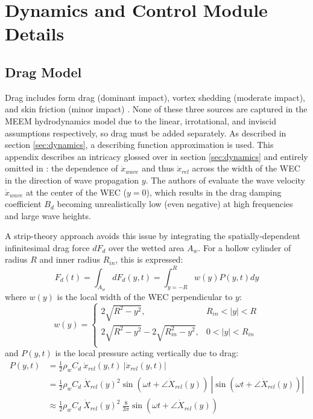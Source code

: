 \clearpage
\section{Dynamics and Control Module Details}
\subsection{Drag Model\label{sec:appendix-drag}}
Drag includes form drag (dominant impact), vortex shedding (moderate impact), and skin friction (minor impact) \cite{quartier_influence_2021}.
None of these three sources are captured in the MEEM hydrodynamics model due to the linear, irrotational, and inviscid assumptions respectively, so drag must be added separately.
As described in section \ref{sec:dynamics}, a describing function approximation is used.
This appendix describes an intricacy glossed over in section \ref{sec:dynamics} and entirely omitted in \cite{quartier_influence_2021}: the dependence of $\dot{x}_{wave}$ and thus $\dot{x}_{rel}$ across the width of the WEC in the direction of wave propagation $y$.
The authors of \cite{quartier_influence_2021} evaluate the wave velocity $\dot{x}_{wave}$ at the center of the WEC ($y=0$), which results in the drag damping coefficient $B_d$ becoming unrealistically low (even negative) at high frequencies and large wave heights.

A strip-theory approach avoids this issue by integrating the spatially-dependent infinitesimal drag force $dF_d$ over the wetted area $A_w$.
For a hollow cylinder of radius $R$ and inner radius $R_{in}$, this is expressed: 
\begin{equation}\label{eq:drag-force-integral}
    F_d(t) = \int_{A_w} dF_d(y,t) = \int_{y=-R}^{R} w(y) P(y,t)dy
\end{equation}
where $w(y)$ is the local width of the WEC perpendicular to $y$:
\begin{equation}\label{eq:drag-width}
    w(y) = \begin{cases}
        2\sqrt{R^2-y^2}, & R_{in}<|y|<R \\
         2\sqrt{R^2-y^2}-2\sqrt{R_{in}^2-y^2}, &0<|y|< R_{in} \\
    \end{cases}
\end{equation}
and $P(y,t)$ is the local pressure acting vertically due to drag:
\begin{equation}\label{eq:drag-pressure}
    \begin{aligned}
    P(y,t) &= \frac{1}{2} \rho_w C_d ~\dot{x}_{rel}(y,t) ~|\dot{x}_{rel}(y,t)| \\
   &=  \frac{1}{2} \rho_w C_d ~\dot{X}_{rel}(y)^2 \sin(\omega t+\angle \dot{X}_{rel}(y)) ~\left| \sin(\omega t+\angle \dot{X}_{rel}(y))\right| \\
   &\approx  \frac{1}{2} \rho_w C_d ~\dot{X}_{rel}(y) ^2~\frac{8}{3\pi}\sin(\omega t+\angle \dot{X}_{rel}(y)) 
    \end{aligned}
\end{equation}

